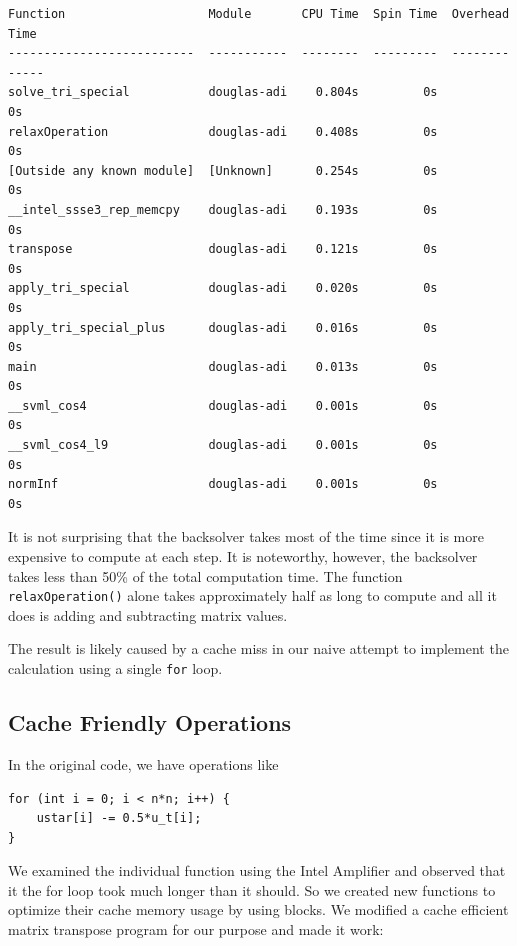 \documentclass[a4paper,11pt]{article}
\begin{document}
\begin{minipage}{\textwidth}
	\begin{framed}
		\begin{center}
			\begin{verbatim}
Function                    Module       CPU Time  Spin Time  Overhead Time
--------------------------  -----------  --------  ---------  -------------
solve_tri_special           douglas-adi    0.804s         0s             0s
relaxOperation              douglas-adi    0.408s         0s             0s
[Outside any known module]  [Unknown]      0.254s         0s             0s
__intel_ssse3_rep_memcpy    douglas-adi    0.193s         0s             0s
transpose                   douglas-adi    0.121s         0s             0s
apply_tri_special           douglas-adi    0.020s         0s             0s
apply_tri_special_plus      douglas-adi    0.016s         0s             0s
main                        douglas-adi    0.013s         0s             0s
__svml_cos4                 douglas-adi    0.001s         0s             0s
__svml_cos4_l9              douglas-adi    0.001s         0s             0s
normInf                     douglas-adi    0.001s         0s             0s
			\end{verbatim}	
		\end{center}
	\end{framed}
\end{minipage}
\begin{multicols}{2}
	 It is not surprising that the backsolver takes most of the time since it is more expensive to compute at each step. It is noteworthy, however, the backsolver takes less than 50\% of the total computation time. The function \verb|relaxOperation()| alone takes approximately half as long to compute and all it does is adding and subtracting matrix values.
\par The result is likely caused by a cache miss in our naive attempt to implement the calculation using a single \verb|for| loop.
	\subsection{Cache Friendly Operations}
	In the original code, we have operations like
	\begin{verbatim}
for (int i = 0; i < n*n; i++) {
	ustar[i] -= 0.5*u_t[i];
}
	\end{verbatim}
	We examined the individual function using the Intel Amplifier and observed that it the for loop took much longer than it should. So we created new functions to optimize their cache memory usage by using blocks. We modified a cache efficient matrix transpose program for our purpose and made it work:
\end{multicols}
\end{document}
